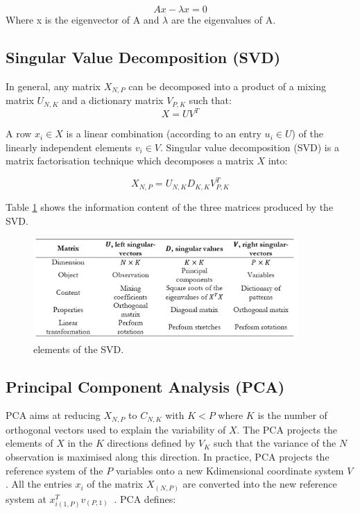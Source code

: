 \begin{equation}
Ax-\lambda x=0
\label{eq_eigenvaluesEigenvectors}
\end{equation}
Where x is the eigenvector of A and $\lambda$ are the eigenvalues of A.

\subsection{Singular Value Decomposition (SVD)} \label{secSVD}
In general, any matrix $X_{N,P}$ can be decomposed into a product of a mixing matrix $U_{N,K}$ and a dictionary matrix $V_{P,K}$ such that:
\begin{equation}
X=UV^T
\label{eq_SVD1}
\end{equation}

A row $x_i\in X$ is a linear combination (according to an entry $u_i\in U$) of the linearly independent elements $v_i\in V$. Singular value decomposition (SVD) is a matrix factorisation technique which decomposes a matrix $X$ into:

\begin{equation}
X_{N,P}=U_{N,K}D_{K,K}V_{P,K}^T
\label{eq_SVD2}
\end{equation}

Table \ref{tab_svd} shows the information content of the three matrices produced by the SVD.

\begin{figure}[hbt!]
\centering
\includegraphics[width=0.9\textwidth]{SectionLetsMath/dimensionalityReduction_figures/tab_svd.png}
\captionsetup{type=table}
\caption{elements of the SVD.}
\label{tab_svd}
\end{figure}

\subsection{Principal Component Analysis (PCA)} \label{secPCA}
PCA aims at reducing  $X_{N,P}$ to $C_{N,K}$  with $K<P$ where $K$ is the number of orthogonal vectors used to explain the variability of $X$. The PCA projects the elements of $X$ in the $K$ directions defined by $V_K$ such that the variance of the $N$ observation is maximised along this direction. In practice, PCA projects the reference system of the $P$ variables onto a new Kdimensional coordinate system $V$. All the entries $x_i$ of the matrix $X_{\left(N,P\right)}$ are converted into the new reference system at $x_{i\left(1,P\right)}^Tv_{\left(P,1\right)}\ $ . PCA defines:

